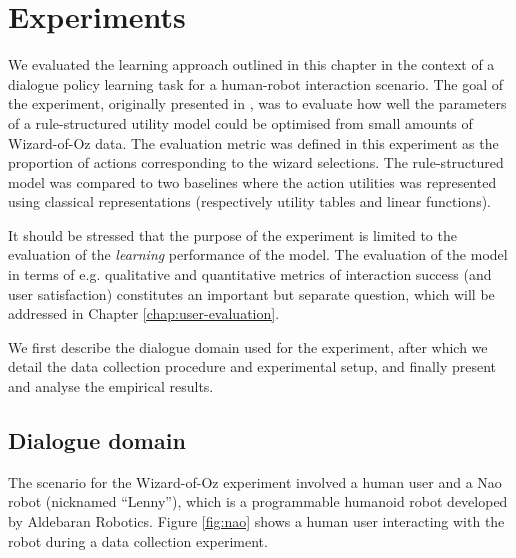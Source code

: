 \section{Experiments}
\label{sec:wozlearning-experiments}

We evaluated the learning approach outlined in this chapter in the context of a dialogue policy learning task for a human-robot interaction scenario.  The goal of the experiment, originally presented in \cite{rulebasedmodels-sigdial2012}, was to evaluate how well the parameters of a rule-structured utility model could be optimised from small amounts of Wizard-of-Oz data.  The evaluation metric was defined in this experiment as the proportion of actions corresponding to the wizard selections. The rule-structured model was compared to two baselines where the action utilities was represented using classical representations (respectively utility tables and linear functions). %

It should be stressed that the purpose of the experiment is limited to the evaluation of the \textit{learning} performance of the model. The evaluation of the model in terms of e.g. qualitative and quantitative metrics of interaction success (and user satisfaction) constitutes an important but separate question, which will be addressed in Chapter \ref{chap:user-evaluation}. 

We first describe the dialogue domain used for the experiment, after which we detail the data collection procedure and experimental setup, and finally present and analyse the empirical results. 

\subsection{Dialogue domain}
\label{sec:wozlearning-experiments-domain}

The scenario for the Wizard-of-Oz experiment involved a human user and a Nao robot (nicknamed ``Lenny''), which is a programmable humanoid robot developed by Aldebaran Robotics. Figure \ref{fig:nao} shows a human user interacting with the robot during a data collection experiment. 

